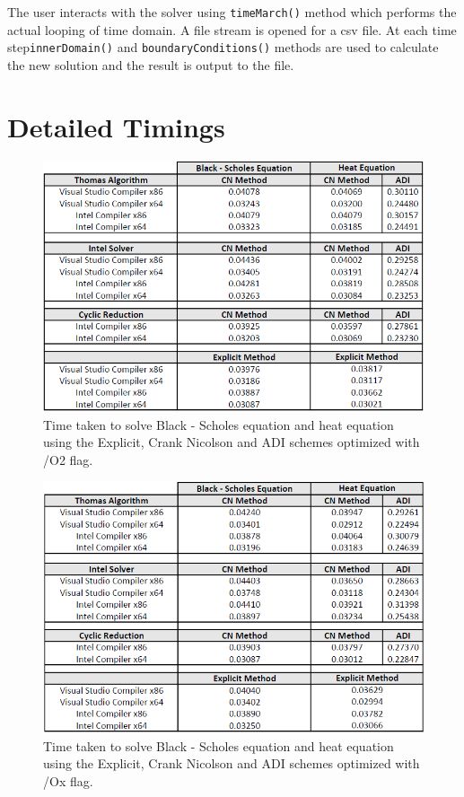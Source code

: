 \documentclass[12pt, oneside]{book}
\theoremstyle{plain}
\theoremstyle{definition}
\begin{document}
The user interacts with the solver using \verb!timeMarch()! method which performs the actual looping of time domain.
A file stream is opened for a csv file. At each time step\verb!innerDomain()! and \verb!boundaryConditions()!  methods are used to calculate the new solution and the result is output to the file. 

\chapter{Detailed Timings} \label{timings}

\begin{figure}[!htb]
    \centering
        \includegraphics[scale=0.6]{o2Optimized.png}
    \caption{Time taken to solve Black - Scholes equation and heat equation using the Explicit, Crank Nicolson and ADI schemes  optimized with /O2 flag.}
\end{figure}

\begin{figure}[!htb]
    \centering
        \includegraphics[scale=0.6]{oXOptimized.png}
    \caption{Time taken to solve Black - Scholes equation and heat equation using the Explicit, Crank Nicolson and ADI schemes optimized with /Ox flag.}
\end{figure}
\end{document}
